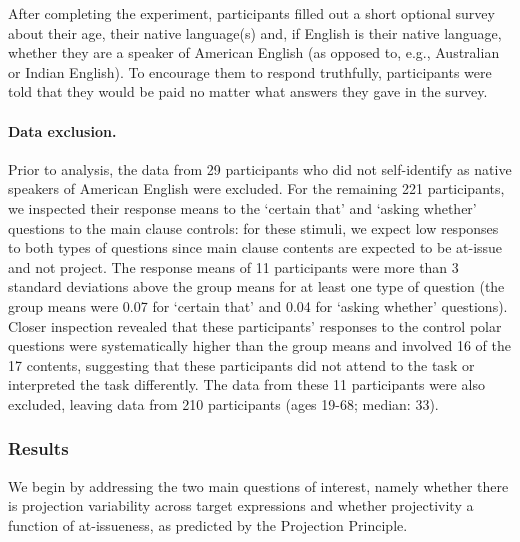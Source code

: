 \documentclass[11pt,fleqn]{article}
\newcommand{\6}{\mbox{$[\hspace*{-.6mm}[$}}
\newcommand{\9}{\mbox{$]\hspace*{-.6mm}]$}}
\begin{document}
After completing the experiment, participants filled out a short optional survey about their age, their native language(s) and, if English is their native language, whether they are a speaker of American English (as opposed to, e.g., Australian or Indian English). To encourage them to respond truthfully, participants were told that they would be paid no matter what answers they gave in the survey.

\paragraph{Data exclusion.}
Prior to analysis, the data from 29 participants who did not self-identify as native speakers of American English were excluded. For the remaining 221 participants, we inspected their response means to the `certain that' and `asking whether' questions 
to the main clause controls: for these stimuli, we expect low responses to both types of questions since main clause contents are expected to be at-issue and not project. The response means of 11 participants were more than 3 standard deviations above the group means for at least one type of question (the group means were 0.07 for `certain that' and 0.04 for `asking whether' questions). Closer inspection revealed that these participants' responses to the control polar questions were systematically higher than the group means and involved 16 of the 17 contents, suggesting that these participants did not attend to the task or interpreted the task differently. The data from these 11 participants were also excluded, leaving data from 210 participants (ages 19-68; median: 33).  


\subsubsection{Results}

We begin by addressing the two main questions of interest, namely whether there is projection variability across target expressions and whether projectivity a function of at-issueness, as predicted by the Projection Principle. 
\end{document}
